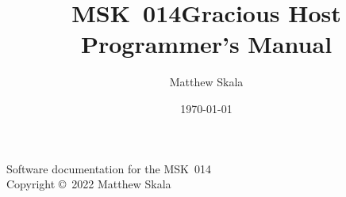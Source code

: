 \documentclass{ncmanual}
\title{MSK~014\quad Gracious Host\\Programmer's Manual}
\author{Matthew Skala}
\date{\today}
\begin{document}
\maketitle


\begin{copyrightpage}
Software documentation for the MSK~014\\
Copyright \copyright\ 2022 Matthew Skala

\GPLThreeStatement
\end{copyrightpage}

\tableofcontents


\texdependspdfworkaround
























\end{document}
